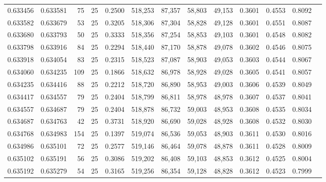 \begin{tabular}{rrrrrrrrrrrrr}
0.633456 & 0.633581 &    75 &  25 &                                     0.2500 & 518,253 &  87,357 &  58,803 &  49,153 & 0.3601 & 0.4553 & 0.8092 \\
0.633582 & 0.633679 &    53 &  25 &                                     0.3205 & 518,306 &  87,304 &  58,828 &  49,128 & 0.3601 & 0.4551 & 0.8087 \\
0.633680 & 0.633793 &    50 &  25 &                                     0.3333 & 518,356 &  87,254 &  58,853 &  49,103 & 0.3601 & 0.4548 & 0.8082 \\
0.633798 & 0.633916 &    84 &  25 &                                     0.2294 & 518,440 &  87,170 &  58,878 &  49,078 & 0.3602 & 0.4546 & 0.8075 \\
0.633918 & 0.634054 &    83 &  25 &                                     0.2315 & 518,523 &  87,087 &  58,903 &  49,053 & 0.3603 & 0.4544 & 0.8067 \\
0.634060 & 0.634235 &   109 &  25 &                                     0.1866 & 518,632 &  86,978 &  58,928 &  49,028 & 0.3605 & 0.4541 & 0.8057 \\
0.634235 & 0.634416 &    88 &  25 &                                     0.2212 & 518,720 &  86,890 &  58,953 &  49,003 & 0.3606 & 0.4539 & 0.8049 \\
0.634417 & 0.634557 &    79 &  25 &                                     0.2404 & 518,799 &  86,811 &  58,978 &  48,978 & 0.3607 & 0.4537 & 0.8041 \\
0.634557 & 0.634687 &    79 &  25 &                                     0.2404 & 518,878 &  86,732 &  59,003 &  48,953 & 0.3608 & 0.4535 & 0.8034 \\
0.634687 & 0.634763 &    42 &  25 &                                     0.3731 & 518,920 &  86,690 &  59,028 &  48,928 & 0.3608 & 0.4532 & 0.8030 \\
0.634768 & 0.634983 &   154 &  25 &                                     0.1397 & 519,074 &  86,536 &  59,053 &  48,903 & 0.3611 & 0.4530 & 0.8016 \\
0.634986 & 0.635101 &    72 &  25 &                                     0.2577 & 519,146 &  86,464 &  59,078 &  48,878 & 0.3611 & 0.4528 & 0.8009 \\
0.635102 & 0.635191 &    56 &  25 &                                     0.3086 & 519,202 &  86,408 &  59,103 &  48,853 & 0.3612 & 0.4525 & 0.8004 \\
0.635192 & 0.635279 &    54 &  25 &                                     0.3165 & 519,256 &  86,354 &  59,128 &  48,828 & 0.3612 & 0.4523 & 0.7999 \\

\end{tabular}
